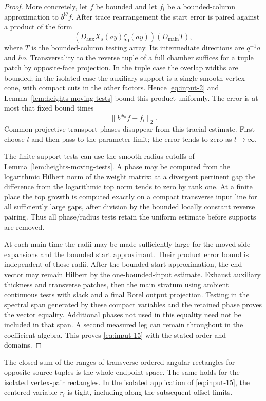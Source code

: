 \begin{proof}
More concretely, let $f$ be bounded and let $f_l$ be a bounded-column
approximation to $b^{\mathrm i\theta}f$.  After trace rearrangement the
start error is paired against a product of the form
\[
 (D_{\mathrm{aux}}X_s(ay)\zeta_0(ay))
 (D_{\mathrm{main}}T),
\]
where $T$ is the bounded-column testing array.  Its intermediate directions
are $q^{-1}o$ and $ho$.  Transversality to the reverse tuple of a full
chamber suffices for a tuple patch by opposite-face projection.  In the
tuple case the overlap widths are bounded; in the isolated case the
auxiliary support is a single smooth vertex cone, with compact cuts in the
other factors.  Hence \eqref{eq:input-2} and
Lemma~\ref{lem:heights-moving-tests} bound this product uniformly.  The error
is at most that fixed bound times
\[
 \|b^{\mathrm i\theta_n}f-f_l\|_2.
\]
Common projective transport phases disappear from this tracial estimate.
First choose $l$ and then pass to the parameter limit; the error tends to
zero as $l\to\infty$.

The finite-support tests can use the smooth radius cutoffs of
Lemma~\ref{lem:heights-moving-tests}.  A phase may be computed from the
logarithmic Hilbert norm of the weight matrix: at a divergent pertinent gap
the difference from the logarithmic top norm tends to zero by rank one.
At a finite place the top growth is computed exactly on a compact
transverse input line for all sufficiently large gaps, after division by
the bounded locally constant reverse pairing.  Thus all phase/radius tests
retain the uniform estimate before supports are removed.

At each main time the radii may be made sufficiently large for the
moved-side expansions and the bounded start approximant.  Their product
error bound is independent of those radii.  After the bounded start
approximation, the end vector may remain Hilbert by the one-bounded-input
estimate.  Exhaust auxiliary thickness and transverse patches, then the
main stratum using ambient continuous tests with slack and a final Borel
output projection.  Testing in the spectral span generated by these
compact variables and the retained phase proves the vector equality.
Additional phases not used in this equality need not be included in that
span.  A second measured leg can remain throughout in the coefficient
algebra.  This proves \eqref{eq:input-15} with the stated order and domains.
\end{proof}

\begin{lemma}
\label{lem:heights-tightness-test}
The closed sum of the ranges of transverse ordered angular rectangles for
opposite source tuples is the whole endpoint space.  The same holds for
the isolated vertex-pair rectangles.  In the isolated application of
\eqref{eq:input-15}, the centered variable $r_i$ is tight, including along
the subsequent offset limits.
\end{lemma}

